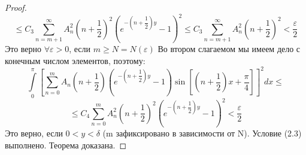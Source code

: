\documentclass[a4paper, 12pt]{article}
\numberwithin{equation}{section}
\numberwithin{lemma}{section}
\numberwithin{definition}{section}
\numberwithin{notabene}{section}
\numberwithin{corollary}{section}
\begin{document}
\begin{proof}
\begin{equation*}
	\leq  C_3 \sum\limits_{n=m+1}^{\infty} A_n^2 \left(n+\dfrac12\right)^2 \left(e^{-\left(n+\dfrac12\right)y} - 1\right)^2 \leq C_3 \sum\limits_{n=m+1}^{\infty} A_n^2 \left(n+\dfrac12\right)^2 < \dfrac{\varepsilon}{2}
\end{equation*}
Это верно $\forall \varepsilon > 0$, если $m \geq N =N(\varepsilon)$\newline
Во втором слагаемом мы имеем дело с конечным числом элементов, поэтому:
\begin{equation*}
	\int\limits_0^\pi \left[	\sum\limits_{n=0}^{m} A_n\left(n+\dfrac12\right) \left( e^{-\left(n+\dfrac12\right)y} - 1\right) \sin{\left[\left(n+\dfrac12\right) x  + \dfrac\pi4\right]} \right]^2 dx \leq
\end{equation*}
\begin{equation*}
\leq C_4 \sum\limits_{n=0}^{m} A_n^2 \left(n +\dfrac12\right)^2 \left(e^{-\left(n+\dfrac12\right)y} - 1\right)^2 < \dfrac{\varepsilon}{2}
\end{equation*}
Это верно, если $0 < y < \delta$ (m зафиксировано в зависимости от N). Условие (2.3) выполнено. Теорема доказана.
\end{proof}
\end{document}
